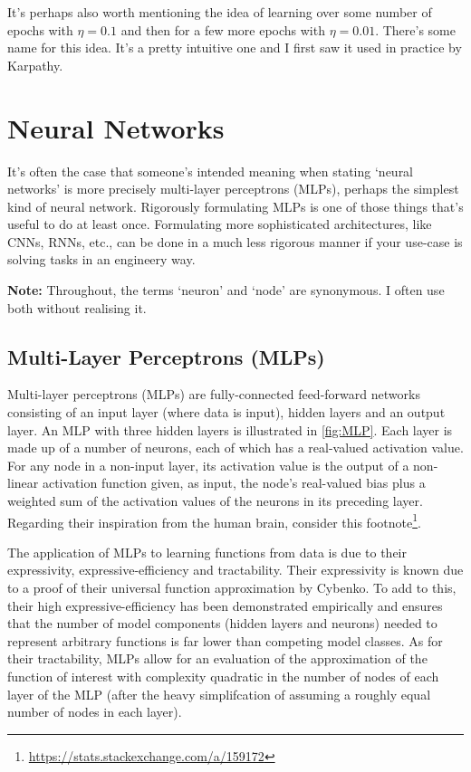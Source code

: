 \documentclass[11pt]{article}
\begin{document}
It's perhaps also worth mentioning the idea of learning over some number of epochs with $\eta=0.1$ and then for a few more epochs with $\eta=0.01$. There's some name for this idea. It's a pretty intuitive one and I first saw it used in practice by Karpathy.

\section{Neural Networks}
It's often the case that someone's intended meaning when stating `neural networks' is more precisely multi-layer perceptrons (MLPs), perhaps the simplest kind of neural network. Rigorously formulating MLPs is one of those things that's useful to do at least once. Formulating more sophisticated architectures, like CNNs, RNNs, etc., can be done in a much less rigorous manner if your use-case is solving tasks in an engineery way.

\vspace{10pt}
\noindent\textbf{Note:} Throughout, the terms `neuron' and `node' are synonymous. I often use both without realising it.

\subsection{Multi-Layer Perceptrons (MLPs)}
\label{sec:multi_layer_perceptrons}

Multi-layer perceptrons (MLPs) are fully-connected feed-forward networks consisting of an input layer (where data is input), hidden layers and an output layer. An MLP with three hidden layers is illustrated in \autoref{fig:MLP}. Each layer is made up of a number of neurons, each of which has a real-valued activation value.  For any node in a non-input layer, its activation value is the output of a non-linear activation function given, as input, the node's real-valued bias plus a weighted sum of the activation values of the neurons in its preceding layer. Regarding their inspiration from the human brain, consider this footnote\footnote{\url{https://stats.stackexchange.com/a/159172}}.

The application of MLPs to learning functions from data is due to their expressivity, expressive-efficiency and tractability. Their expressivity is known due to a proof of their universal function approximation by Cybenko. To add to this, their high expressive-efficiency has been demonstrated empirically and ensures that the number of model components (hidden layers and neurons) needed to represent arbitrary functions is far lower than competing model classes. As for their tractability, MLPs allow for an evaluation of the approximation of the function of interest with complexity quadratic in the number of nodes of each layer of the MLP (after the heavy simplifcation of assuming a roughly equal number of nodes in each layer).
\end{document}
